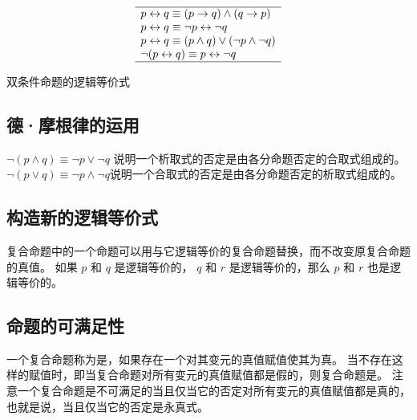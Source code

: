 {{\begin{minipage}[c]{\textwidth{}}
\begin{minipage}[c]{.4\textwidth{}}
\begin{minipage}[c]{\textwidth{}}
\begin{table}[H]
                        \[
                            \begin{array}{l}
                                \hline
                                p \leftrightarrow q \equiv (p \rightarrow q) \wedge (q \rightarrow p) \\
                                p \leftrightarrow q \equiv \neg p \leftrightarrow \neg q \\
                                p \leftrightarrow q \equiv (p \wedge q) \vee (\neg p \wedge \neg q) \\
                                \neg (p \leftrightarrow q) \equiv p \leftrightarrow \neg q \\
                                \hline
                            \end{array}
                        \]

                        \caption{双条件命题的逻辑等价式}
                    \end{table}
                \end{minipage}
            \end{minipage}
        \end{minipage}
    }

    \subsection{德·摩根律的运用}
    {
        $\neg (p \wedge q) \equiv \neg p \vee \neg q$ 说明一个析取式的否定是由各分命题否定的合取式组成的。
        $\neg (p \vee q) \equiv \neg p \wedge \neg q$说明一个合取式的否定是由各分命题否定的析取式组成的。
    }

    \subsection{构造新的逻辑等价式}
    {
        复合命题中的一个命题可以用与它逻辑等价的复合命题替换，而不改变原复合命题的真值。
        如果 $p$ 和 $q$ 是逻辑等价的， $q$ 和 $r$ 是逻辑等价的，那么 $p$ 和 $r$ 也是逻辑等价的。
    }

    \subsection{命题的可满足性}
    {
        一个复合命题称为是，如果存在一个对其变元的真值赋值使其为真。
        当不存在这样的赋值时，即当复合命题对所有变元的真值赋值都是假的，则复合命题是。
        注意一个复合命题是不可满足的当且仅当它的否定对所有变元的真值赋值都是真的，也就是说，当且仅当它的否定是永真式。

}}
